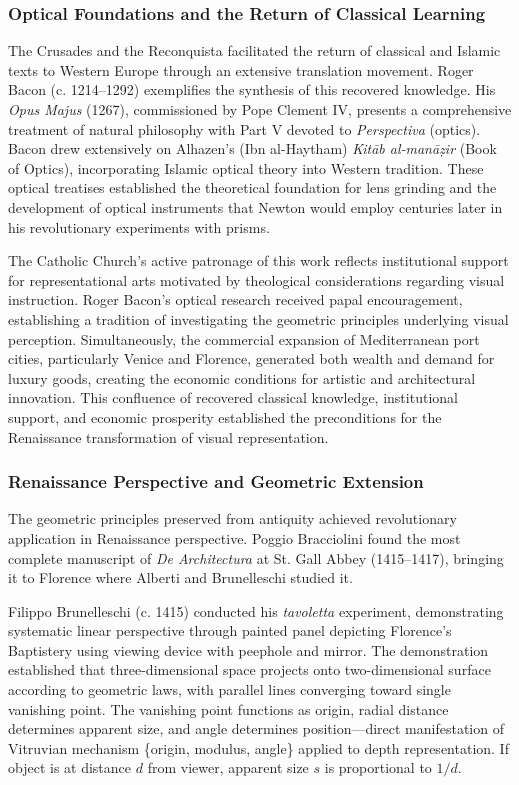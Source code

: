 \subsubsection{Optical Foundations and the Return of Classical Learning}

The Crusades and the Reconquista facilitated the return of classical and Islamic texts to Western Europe through an extensive translation movement. Roger Bacon (c. 1214--1292) exemplifies the synthesis of this recovered knowledge. His \textit{Opus Majus} (1267), commissioned by Pope Clement IV, presents a comprehensive treatment of natural philosophy with Part V devoted to \textit{Perspectiva} (optics). Bacon drew extensively on Alhazen's (Ibn al-Haytham) \textit{Kit\={a}b al-man\={a}\d{z}ir} (Book of Optics), incorporating Islamic optical theory into Western tradition. These optical treatises established the theoretical foundation for lens grinding and the development of optical instruments that Newton would employ centuries later in his revolutionary experiments with prisms.

The Catholic Church's active patronage of this work reflects institutional support for representational arts motivated by theological considerations regarding visual instruction. Roger Bacon's optical research received papal encouragement, establishing a tradition of investigating the geometric principles underlying visual perception. Simultaneously, the commercial expansion of Mediterranean port cities, particularly Venice and Florence, generated both wealth and demand for luxury goods, creating the economic conditions for artistic and architectural innovation. This confluence of recovered classical knowledge, institutional support, and economic prosperity established the preconditions for the Renaissance transformation of visual representation.

\subsubsection{Renaissance Perspective and Geometric Extension}

The geometric principles preserved from antiquity achieved revolutionary application in Renaissance perspective. Poggio Bracciolini found the most complete manuscript of \textit{De Architectura} at St. Gall Abbey (1415--1417), bringing it to Florence where Alberti and Brunelleschi studied it.

Filippo Brunelleschi (c. 1415) conducted his \textit{tavoletta} experiment, demonstrating systematic linear perspective through painted panel depicting Florence's Baptistery using viewing device with peephole and mirror. The demonstration established that three-dimensional space projects onto two-dimensional surface according to geometric laws, with parallel lines converging toward single vanishing point. The vanishing point functions as origin, radial distance determines apparent size, and angle determines position—direct manifestation of Vitruvian mechanism \{origin, modulus, angle\} applied to depth representation. If object is at distance $d$ from viewer, apparent size $s$ is proportional to $1/d$.

